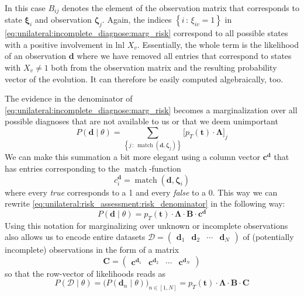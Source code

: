 \documentclass[\relativeRoot/main.tex]{subfiles}
\begin{document}
%
In this case $B_{ij}$ denotes the element of the observation matrix that corresponds to state $\boldsymbol{\xi}_i$ and observation $\boldsymbol{\zeta}_j$. Again, the indices $\left\{ i \,:\, \xi_{iv} = 1 \right\}$ in \cref{eq:unilateral:incomplete_diagnose:marg_risk} correspond to all possible states with a positive involvement in \acrlong{lnl} $X_v$. Essentially, the whole term is the likelihood of an observation $\mathbf{d}$ where we have removed all entries that correspond to states with $X_v \neq 1$ both from the observation matrix and the resulting probability vector of the evolution. It can therefore be easily computed algebraically, too.

The evidence in the denominator of \cref{eq:unilateral:incomplete_diagnose:marg_risk} becomes a marginalization over all possible diagnoses that are not available to us or that we deem unimportant
%
\begin{equation} \label{eq:unilateral:risk_assessment:risk_denominator}
    P \left( \mathbf{d} \mid \theta \right) = \sum_{\left\{ j \,:\, \operatorname{match}(\mathbf{d}, \boldsymbol{\zeta}_j) \right\}}{\Big[ p_T\left( \mathbf{t} \right) \cdot \boldsymbol{\Lambda} \Big]_j}
\end{equation}
%
We can make this summation a bit more elegant using a column vector $\mathbf{c}^{\mathbf{d}}$ that has entries corresponding to the $\operatorname{match}$-function
%
\begin{equation}
    c_i^{\mathbf{d}} = \operatorname{match}(\mathbf{d}, \boldsymbol{\zeta}_i)
\end{equation}
%
where every \emph{true} corresponds to a 1 and every \emph{false} to a 0. This way we can rewrite \cref{eq:unilateral:risk_assessment:risk_denominator} in the following way:
%
\begin{equation}
    P \left( \mathbf{d} \mid \theta \right) = p_T\left( \mathbf{t} \right) \cdot \boldsymbol{\Lambda} \cdot \mathbf{B} \cdot \mathbf{c}^{\mathbf{d}}
\end{equation}
%
Using this notation for marginalizing over unknown or incomplete observations also allows us to encode entire datasets $\boldsymbol{\mathcal{D}} = \begin{pmatrix} \mathbf{d}_1 & \mathbf{d}_2 & \cdots & \mathbf{d}_N \end{pmatrix}$ of (potentially incomplete) observations in the form of a matrix
%
\begin{equation}
    \mathbf{C} = 
    \begin{pmatrix} \mathbf{c}^{\mathbf{d}_1} & \mathbf{c}^{\mathbf{d}_2} & \cdots & \mathbf{c}^{\mathbf{d}_N} \end{pmatrix}
\end{equation}
%
so that the row-vector of likelihoods reads as
%
\begin{equation}
    P \left( \boldsymbol{\mathcal{D}} \mid \theta \right) = \big( P \left( \mathbf{d}_n \mid \theta \right) \big)_{n \in [1,N]} = p_T\left( \mathbf{t} \right) \cdot \boldsymbol{\Lambda} \cdot \mathbf{B} \cdot \mathbf{C}
\end{equation}
\end{document}
